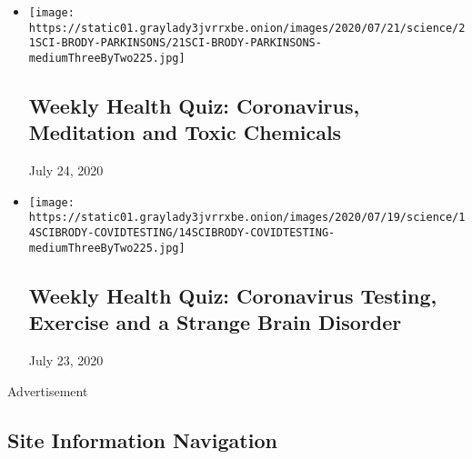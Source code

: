 \begin{itemize}
\item
  \href{https://www.nytimes3xbfgragh.onion/interactive/2020/07/24/well/live/24healthquiz-07242020.html}{}

  \texttt{[image: https://static01.graylady3jvrrxbe.onion/images/2020/07/21/science/21SCI-BRODY-PARKINSONS/21SCI-BRODY-PARKINSONS-mediumThreeByTwo225.jpg]}

  \hypertarget{weekly-health-quiz-coronavirus-meditation-and-toxic-chemicals}{%
  \subsection{Weekly Health Quiz: Coronavirus, Meditation and Toxic
  Chemicals}\label{weekly-health-quiz-coronavirus-meditation-and-toxic-chemicals}}

  July 24, 2020
\item
  \href{https://www.nytimes3xbfgragh.onion/interactive/2020/07/17/well/live/17healthquiz-07172020.html}{}

  \texttt{[image: https://static01.graylady3jvrrxbe.onion/images/2020/07/19/science/14SCIBRODY-COVIDTESTING/14SCIBRODY-COVIDTESTING-mediumThreeByTwo225.jpg]}

  \hypertarget{weekly-health-quiz-coronavirus-testing-exercise-and-a-strange-brain-disorder}{%
  \subsection{Weekly Health Quiz: Coronavirus Testing, Exercise and a
  Strange Brain
  Disorder}\label{weekly-health-quiz-coronavirus-testing-exercise-and-a-strange-brain-disorder}}

  July 23, 2020
\end{itemize}

Advertisement

\hypertarget{site-information-navigation}{%
\subsection{Site Information
Navigation}\label{site-information-navigation}}

